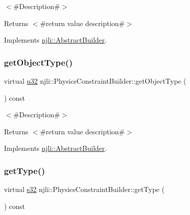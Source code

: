 $<$\#\+Description\#$>$

\begin{DoxyReturn}{Returns}
$<$\#return value description\#$>$ 
\end{DoxyReturn}


Implements \mbox{\hyperlink{classnjli_1_1_abstract_builder_a902f73ea78031b06aca183a417f3413b}{njli\+::\+Abstract\+Builder}}.

\mbox{\label{classnjli_1_1_physics_constraint_builder_aeebea41ee8495110877d9ba37abe136b}} 
\subsubsection{\texorpdfstring{get\+Object\+Type()}{getObjectType()}}
{\footnotesize\ttfamily virtual \mbox{\hyperlink{_util_8h_a10e94b422ef0c20dcdec20d31a1f5049}{u32}} njli\+::\+Physics\+Constraint\+Builder\+::get\+Object\+Type (\begin{DoxyParamCaption}{ }\end{DoxyParamCaption}) const\hspace{0.3cm}{\ttfamily [virtual]}}

$<$\#\+Description\#$>$

\begin{DoxyReturn}{Returns}
$<$\#return value description\#$>$ 
\end{DoxyReturn}


Implements \mbox{\hyperlink{classnjli_1_1_abstract_builder_a0f2d344fcf697b167f4f2b1122b5fb33}{njli\+::\+Abstract\+Builder}}.

\mbox{\label{classnjli_1_1_physics_constraint_builder_a57a5d069a0231a67c42ddc3cd46eb43c}} 
\subsubsection{\texorpdfstring{get\+Type()}{getType()}}
{\footnotesize\ttfamily virtual \mbox{\hyperlink{_util_8h_aa62c75d314a0d1f37f79c4b73b2292e2}{s32}} njli\+::\+Physics\+Constraint\+Builder\+::get\+Type (\begin{DoxyParamCaption}{ }\end{DoxyParamCaption}) const\hspace{0.3cm}{\ttfamily [virtual]}}

